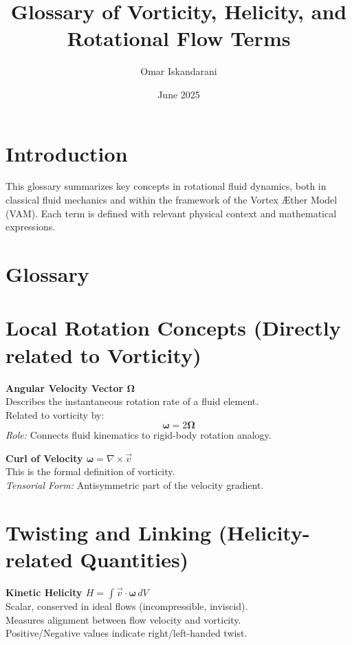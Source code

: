 \documentclass[12pt]{article}
\title{Glossary of Vorticity, Helicity, and Rotational Flow Terms}
\author{Omar Iskandarani}
\date{June 2025}
\begin{document}
\maketitle

\section*{Introduction}
This glossary summarizes key concepts in rotational fluid dynamics, both in classical fluid mechanics and within the framework of the Vortex \AE{}ther Model (VAM). Each term is defined with relevant physical context and mathematical expressions.

\section*{Glossary}




\section*{Local Rotation Concepts (Directly related to Vorticity)}

\textbf{Angular Velocity Vector \( \boldsymbol{\Omega} \)} \\
Describes the instantaneous rotation rate of a fluid element. \\
Related to vorticity by:
\[
\boldsymbol{\omega} = 2 \boldsymbol{\Omega}
\]
\textit{Role:} Connects fluid kinematics to rigid-body rotation analogy.

\medskip
\textbf{Curl of Velocity \( \boldsymbol{\omega} = \nabla \times \vec{v} \)} \\
This is the formal definition of vorticity. \\
\textit{Tensorial Form:} Antisymmetric part of the velocity gradient.

\section*{Twisting and Linking (Helicity-related Quantities)}

\textbf{Kinetic Helicity \( H = \int \vec{v} \cdot \boldsymbol{\omega} \, dV \)} \\
Scalar, conserved in ideal flows (incompressible, inviscid). \\
Measures alignment between flow velocity and vorticity. \\
Positive/Negative values indicate right/left-handed twist.
\end{document}
